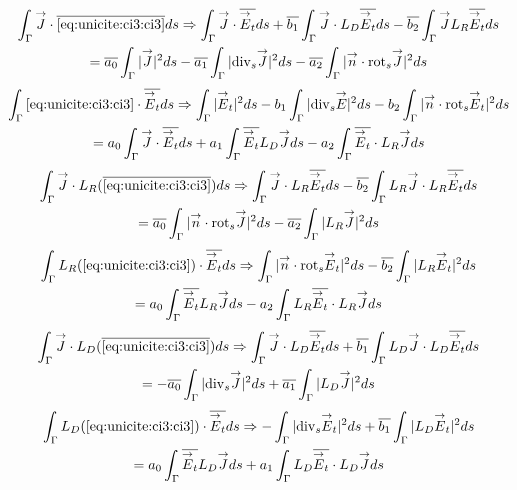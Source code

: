 			\begin{multline}
				\label{eq:unicite:ci3:csu3-1}
				\int_\Gamma \vJ\cdot\conj{\eqref{eq:unicite:ci3:ci3}}ds \Rightarrow
				\int_\Gamma \vJ \cdot \conj{\vE_t} ds  + \conj{b_1} \int_\Gamma \vJ\cdot L_D\conj{\vE_t} ds - \conj{b_2} \int_\Gamma \vJ L_R\conj{\vE_t} ds \\
				= \conj{a_0} \int_\Gamma |\vJ|^2ds - \conj{a_1} \int_\Gamma |\tdivs \vJ|^2 ds - \conj{a_2} \int_\Gamma |\vn \cdot \trots \vJ|^2 ds
			\end{multline}
			\begin{multline}
				\label{eq:unicite:ci3:csu3-2}
				\int_\Gamma \eqref{eq:unicite:ci3:ci3} \cdot \conj{\vE_t} ds \Rightarrow
				\int_\Gamma |\vE_t|^2 ds  - b_1 \int_\Gamma | \tdivs \vE |^2 ds - b_2 \int_\Gamma | \vn \cdot \trots \vE_t|^2 ds \\
				= a_0 \int_\Gamma \vJ\cdot \conj{\vE_t}ds + a_1 \int_\Gamma \conj{\vE_t} L_D \vJ ds - a_2 \int_\Gamma \conj{\vE_t} \cdot L_R \vJ ds
			\end{multline}
			\begin{multline}
				\label{eq:unicite:ci3:csu3-3}
				\int_\Gamma \vJ \cdot L_R ( \conj{\eqref{eq:unicite:ci3:ci3}} ) ds \Rightarrow
				\int_\Gamma \vJ \cdot L_R \conj{\vE_t} ds  - \conj{b_2} \int_\Gamma L_R \vJ \cdot L_R \conj{\vE_t} ds \\
				=  \conj{a_0} \int_\Gamma |\vn \cdot \trots \vJ|^2ds - \conj{a_2} \int_\Gamma | L_R \vJ|^2 ds
			\end{multline}
			\begin{multline}
				\label{eq:unicite:ci3:csu3-4}
				\int_\Gamma  L_R ( \eqref{eq:unicite:ci3:ci3} ) \cdot \conj{\vE_t} ds \Rightarrow
				\int_\Gamma | \vn \cdot \trots \vE_t |^2 ds  - \conj{b_2} \int_\Gamma | L_R \vE_t|^2 ds \\
				= a_0 \int_\Gamma \conj{\vE_t} L_R \vJ ds - a_2 \int_\Gamma L_R \conj{\vE_t} \cdot L_R \vJ ds
			\end{multline}
				\begin{multline}
				\label{eq:unicite:ci3:csu3-5}
				\int_\Gamma \vJ \cdot L_D ( \conj{\eqref{eq:unicite:ci3:ci3}} ) ds \Rightarrow
				\int_\Gamma \vJ \cdot L_D \conj{\vE_t} ds  + \conj{b_1} \int_\Gamma L_D \vJ \cdot L_D \conj{\vE_t} ds \\
				= - \conj{a_0} \int_\Gamma |\tdivs \vJ|^2ds + \conj{a_1} \int_\Gamma | L_D \vJ|^2 ds
			\end{multline}
			\begin{multline}
				\label{eq:unicite:ci3:csu3-6}
				\int_\Gamma  L_D ( \eqref{eq:unicite:ci3:ci3} ) \cdot \conj{\vE_t} ds \Rightarrow
				-\int_\Gamma | \tdivs \vE_t |^2 ds  + \conj{b_1} \int_\Gamma | L_D \vE_t|^2 ds \\
				= a_0 \int_\Gamma \conj{\vE_t} L_D \vJ ds + a_1 \int_\Gamma L_D \conj{\vE_t} \cdot L_D \vJ ds
			\end{multline}
